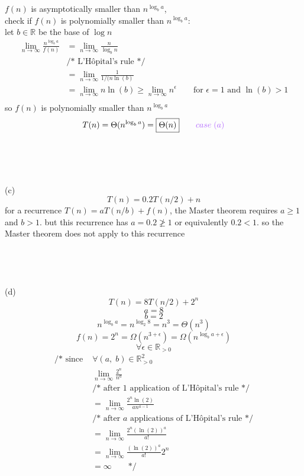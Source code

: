 \documentclass[12pt,border=4pt,multi]{article}%
\begin{document}
$f(n)$ is asymptotically smaller than $n^{\log_b a}$,\\
check if $f(n)$ is polynomially smaller than $n^{\log_b a}$:\\
let $b \in \mathbb{R}$ be the base of $\log n$
\begin{align*}
\lim_{n \rightarrow \infty} \frac{n^{\log_b a}}{f(n)} &= \lim_{n \rightarrow \infty} \frac{n}{\log_b n}\\
&\text{/* L'Hôpital's rule */}\\
&= \lim_{n \rightarrow \infty} \frac{1}{1 / (n \ln (b)}\\
&= \lim_{n \rightarrow \infty} n\ln(b) \geq \lim_{n \rightarrow \infty} n^{\epsilon} \qquad \text{for } \epsilon = 1 \text{ and } \ln(b) > 1\\
\end{align*}
so $f(n)$ is polynomially smaller than $n^{\log_b a}$
\begin{align*}
T(n) = \Theta(n^{\log_b a}) = \boxed{\Theta(n)} \qquad \textcolor{orchid}{case\;(a)}
\end{align*}
\\
\\
\\
\\
(c)
\[T(n) = 0.2T(n/2) + n\]
for a recurrence $T(n) = aT(n/ b) + f(n)$, the Master theorem requires $a \geq 1$ and $b > 1$. but this recurrence has $a = 0.2 \not\geq 1$ or equivalently $0.2 < 1$. so the Master theorem does not apply to this recurrence\\
\\
\\
\\
\\
(d)
\[T(n) = 8T(n / 2) + 2^n\]
\[a = 8\]
\[b = 2\]
\[n^{\log_b a} = n^{\log_2 8} = n^3 = \Theta(n^3)\]
\[f(n) = 2^n = \Omega(n^{3 + \epsilon}) = \Omega(n^{\log_b a + \epsilon})\]
\[\forall \epsilon \in \mathbb{R}_{>0}\]
\begin{align*}
\text{/* since } &\forall (a,\; b) \in \mathbb{R}_{>0}^2\\
&\lim_{n \rightarrow \infty} \frac{2^n}{n^a}\\
&\text{/* after 1 application of L'Hôpital's rule */}\\
&= \lim_{n \rightarrow \infty} \frac{2^n\ln(2)}{a n^{a - 1}}\\
&\text{/* after $a$ applications of L'Hôpital's rule */}\\
&= \lim_{n \rightarrow \infty} \frac{2^n(\ln(2))^a}{a!}\\
&= \lim_{n \rightarrow \infty} \frac{(\ln(2))^a}{a!} 2^n\\
&= \infty \qquad \text{*/}
\end{align*}
\end{document}
